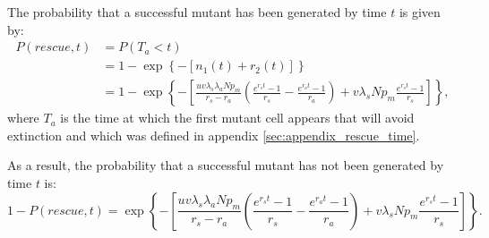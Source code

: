 \documentclass[12pt]{extarticle}
\newcommand{\e}{e}
\renewcommand{\Delta}{r}
\begin{document}
\begin{appendices}
The probability that a successful mutant has been generated by time $t$ is given by:
\begin{align*}
P\left(rescue,t\right)&=P\left(T_a<t\right)\\
&=1-\exp\left\{-\left[n_1\left(t\right)+r_2\left(t\right)\right]\right\}\\
&=1-\exp\left\{-\left[\frac{uv\lambda_s\lambda_aNp_m}{\Delta_s-\Delta_a}\left(\frac{\e^{\Delta_st}-1}{\Delta_s}-\frac{\e^{\Delta_at}-1}{\Delta_a}\right)+ v\lambda_sNp_m\frac{\e^{\Delta_s t}-1}{\Delta_s}\right]\right\},
\end{align*}
where $T_a$ is the time at which the first mutant cell appears that will avoid extinction and which was defined in appendix \ref{sec:appendix_rescue_time}.

As a result, the probability that a successful mutant has not been generated by time $t$ is:
\begin{equation}
1-P\left(rescue,t\right)=\exp\left\{-\left[\frac{uv\lambda_s\lambda_aNp_m}{\Delta_s-\Delta_a}\left(\frac{\e^{\Delta_st}-1}{\Delta_s}-\frac{\e^{\Delta_at}-1}{\Delta_a}\right)+ v\lambda_sNp_m\frac{\e^{\Delta_s t}-1}{\Delta_s}\right]\right\}.
\end{equation}

\end{appendices}
\end{document}
